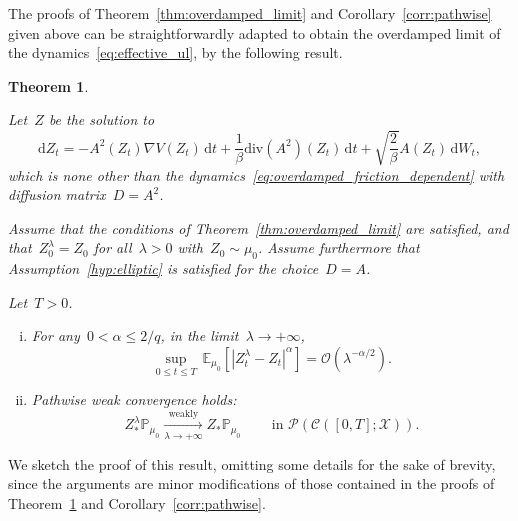 \documentclass[10pt]{article}
\renewcommand{\d}{\mathrm{d}}
\newcommand{\E}{\mathbb{E}}
\renewcommand{\P}{\mathbb{P}}
\renewcommand{\div}{\mathrm{div}}
\newcommand{\cX}{\mathcal{X}}
\newcommand{\cC}{\mathcal{C}}
\newcommand{\cP}{\mathcal{P}}
\newcommand{\1}{\mathbbm 1}
\newcommand{\bigo}{\mathcal{O}}
\newtheorem{theorem}{Theorem}
\begin{document}
    The proofs of Theorem~\ref{thm:overdamped_limit} and Corollary~\ref{corr:pathwise} given above can be straightforwardly adapted to obtain the overdamped limit of the dynamics~\eqref{eq:effective_ul}, by the following result.
    \begin{theorem}
        \label{thm:effective_od}

     Let~$Z$ be the solution to
    \begin{equation}
        \label{eq:effective_od}
        \d Z_t = -A^2(Z_t)\nabla V(Z_t)\,\d t +\frac1\beta\div\left(A^2\right)(Z_t)\,\d t +\sqrt{\frac{2}{\beta}}A(Z_t)\,\d W_t,
    \end{equation}
      which is none other than the dynamics~\eqref{eq:overdamped_friction_dependent} with diffusion matrix~$D=A^2$.

    Assume that the conditions of Theorem~\ref{thm:overdamped_limit} are satisfied, and that~$Z_0^\lambda = Z_0$ for all~$\lambda>0$ with~$Z_0\sim \mu_0$.
    Assume furthermore that Assumption~\ref{hyp:elliptic} is satisfied for the choice~$D=A$.

    Let~$T>0$.
    \begin{enumerate}[i)]
            \item{
            For any~$0<\alpha\leq 2/q$, in the limit~$\lambda\to +\infty$,
            \begin{equation}
                \label{eq:effective_wasserstein_bound}
        \underset{0\leq t\leq T}{\sup}\,\E_{\mu_0}\left[\left|Z_t^\lambda - Z_t\right|^\alpha\right] = \bigo\left(\lambda^{-\alpha/2}\right).
    \end{equation}}
            \item{
            Pathwise weak convergence holds:
                \begin{equation}
            \label{eq:effective_pathwise_cv}
        Z_*^\lambda\P_{\mu_0} \xrightarrow[\lambda\to +\infty]{\text{weakly}} Z_*\P_{\mu_0}\,\qquad \text{in }\cP\left(\cC\left([0,T];\cX\right)\right).
    \end{equation} }
    \end{enumerate}
    \end{theorem}

    We sketch the proof of this result, omitting some details for the sake of brevity, since the arguments are minor modifications of those contained in the proofs of Theorem~\ref{thm:effective_od} and Corollary~\ref{corr:pathwise}.
\end{document}
